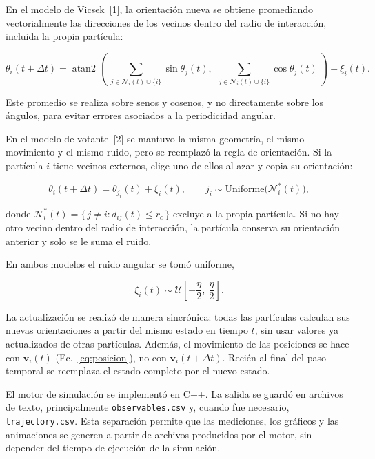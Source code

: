 \documentclass[11pt,a4paper]{article}
\renewcommand{\vec}[1]{\mathbf{#1}}
\begin{document}
En el modelo de Vicsek~[1], la orientación nueva se obtiene promediando vectorialmente las direcciones de los vecinos dentro del radio de interacción, incluida la propia partícula:

\begin{equation}
\theta_i(t+\Delta t) = \operatorname{atan2}\!\left(\ \sum_{j \in \mathcal{N}_i(t)\cup\{i\}} \sin\theta_j(t),\ \ \sum_{j \in \mathcal{N}_i(t)\cup\{i\}} \cos\theta_j(t)\ \right) + \xi_i(t).
\label{eq:vicsek}
\end{equation}

Este promedio se realiza sobre senos y cosenos, y no directamente sobre los ángulos, para evitar errores asociados a la periodicidad angular.

En el modelo de votante~[2] se mantuvo la misma geometría, el mismo movimiento y el mismo ruido, pero se reemplazó la regla de orientación. Si la partícula $i$ tiene vecinos externos, elige uno de ellos al azar y copia su orientación:

\begin{equation}
\theta_i(t+\Delta t) = \theta_{j_i}(t) + \xi_i(t), \qquad j_i \sim \text{Uniforme}\big(\mathcal{N}_i^{*}(t)\big),
\label{eq:votante}
\end{equation}

donde $\mathcal{N}_i^{*}(t) = \{\, j \neq i : d_{ij}(t) \le r_c \,\}$ excluye a la propia partícula. Si no hay otro vecino dentro del radio de interacción, la partícula conserva su orientación anterior y solo se le suma el ruido.

En ambos modelos el ruido angular se tomó uniforme,

\begin{equation}
\xi_i(t) \sim \mathcal{U}\!\left[-\frac{\eta}{2},\ \frac{\eta}{2}\right].
\label{eq:ruido}
\end{equation}

La actualización se realizó de manera sincrónica: todas las partículas calculan sus nuevas orientaciones a partir del mismo estado en tiempo $t$, sin usar valores ya actualizados de otras partículas. Además, el movimiento de las posiciones se hace con $\vec{v}_i(t)$ (Ec.~\ref{eq:posicion}), no con $\vec{v}_i(t+\Delta t)$. Recién al final del paso temporal se reemplaza el estado completo por el nuevo estado.

El motor de simulación se implementó en C++. La salida se guardó en archivos de texto, principalmente \texttt{observables.csv} y, cuando fue necesario, \texttt{trajectory.csv}. Esta separación permite que las mediciones, los gráficos y las animaciones se generen a partir de archivos producidos por el motor, sin depender del tiempo de ejecución de la simulación.
\end{document}
